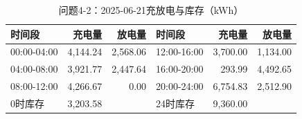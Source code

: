 \begin{table}[H]\centering\small\caption{问题4-2：2025-06-21充放电与库存（kWh）}\label{tab:q4_220250621b}
\begin{tabular}{lrrlrr}\toprule
时间段 & 充电量 & 放电量 & 时间段 & 充电量 & 放电量\\\midrule
00:00-04:00 & 4,144.24 & 2,568.06 & 12:00-16:00 & 3,700.00 & 1,134.00\\
04:00-08:00 & 3,921.77 & 2,447.64 & 16:00-20:00 & 293.99 & 4,492.65\\
08:00-12:00 & 4,266.67 & 0.00 & 20:00-24:00 & 6,754.83 & 2,512.90\\
0时库存 & 3,203.58 &  & 24时库存 & 9,360.00 & \\
\bottomrule\end{tabular}\end{table}
